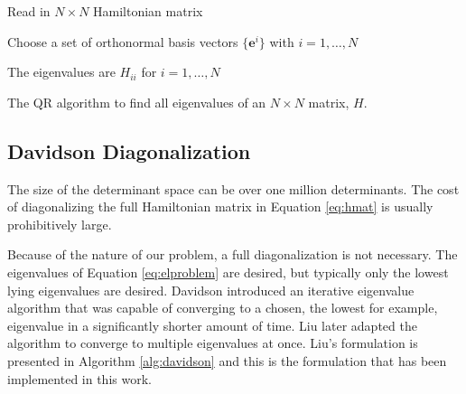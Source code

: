 \documentclass[final,3p,times,twocolumn]{elsarticle}
\begin{document}
\begin{algorithm}
 Read in $N \times N$ Hamiltonian matrix\;
 
 Choose a set of orthonormal basis vectors $\{\mathbf{e}^i\}$ with $i = 1,  \ldots, N$\;
 
 The eigenvalues are $H_{ii}$ for $i = 1, \ldots, N$\;
\caption{The QR algorithm to find all eigenvalues of an $N 
\times N$ matrix, $H$.} 
\label{alg:qr}
\end{algorithm}

\subsection{Davidson Diagonalization} \label{sec:davidson}
The size of the determinant space can be over one million determinants. The cost of diagonalizing the full Hamiltonian matrix in Equation \eqref{eq:hmat} is usually prohibitively large. %

Because of the nature of our problem, a full diagonalization is not necessary. The eigenvalues of Equation \eqref{eq:elproblem} are desired, but typically only the lowest lying eigenvalues are desired. Davidson introduced an iterative eigenvalue algorithm that was capable of converging to a chosen, the lowest for example, eigenvalue in a significantly shorter amount of time.\cite{davidson} Liu later adapted the algorithm to converge to multiple eigenvalues at once.\cite{liu} Liu's formulation is presented in Algorithm \ref{alg:davidson} and this is the formulation that has been implemented in this work.
\end{document}
